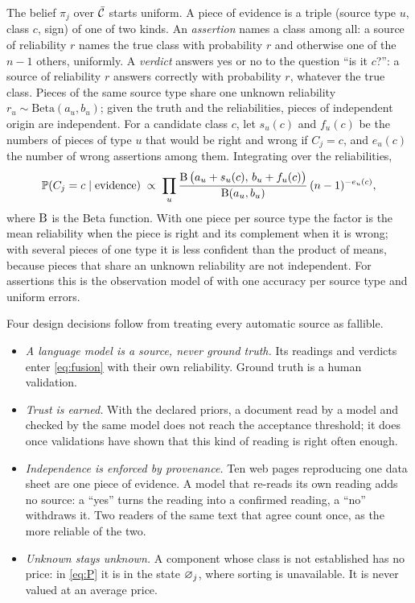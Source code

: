 The belief $\pi_j$ over $\bar{\mathcal{C}}$ starts uniform. A piece of evidence is a triple (source type $u$, class $c$, sign) of
one of two kinds. An \emph{assertion} names a class among all: a source of reliability $r$ names the true class with
probability $r$ and otherwise one of the $n-1$ others, uniformly. A \emph{verdict} answers yes or no to the question
``is it $c$?'': a source of reliability $r$ answers correctly with probability $r$, whatever the true class. Pieces
of the same source type share one unknown reliability $r_u\sim\mathrm{Beta}(a_u,b_u)$; given the truth and the
reliabilities, pieces of independent origin are independent. For a candidate class $c$, let $s_u(c)$ and $f_u(c)$
be the numbers of pieces of type $u$ that would be right and wrong if $C_j=c$, and $e_u(c)$ the number of wrong
assertions among them. Integrating over the reliabilities,
\begin{equation}\label{eq:fusion}
\mathbb{P}(C_j=c\mid\text{evidence})\;\propto\;\prod_{u}\frac{\operatorname{B}\big(a_u+s_u(c),\,b_u+f_u(c)\big)}{\operatorname{B}(a_u,b_u)}\,
(n-1)^{-e_u(c)},
\end{equation}
where $\operatorname{B}$ is the Beta function. With one piece per source type the factor is the mean reliability when the piece
is right and its complement when it is wrong; with several pieces of one type it is less confident than the product
of means, because pieces that share an unknown reliability are not independent. For assertions this is the
observation model of \citet{dawid1979} with one accuracy per source type and uniform errors.

Four design decisions follow from treating every automatic source as fallible.
\begin{itemize}
\item \emph{A language model is a source, never ground truth.} Its readings and verdicts enter \eqref{eq:fusion} with
  their own reliability. Ground truth is a human validation.
\item \emph{Trust is earned.} With the declared priors, a document read by a model and checked by the same model
  does not reach the acceptance threshold; it does once validations have shown that this kind of reading is right
  often enough.
\item \emph{Independence is enforced by provenance.} Ten web pages reproducing one data sheet are one piece of
  evidence. A model that re-reads its own reading adds no source: a ``yes'' turns the reading into a confirmed
  reading, a ``no'' withdraws it. Two readers of the same text that agree count once, as the more reliable of the
  two.
\item \emph{Unknown stays unknown.} A component whose class is not established has no price: in \eqref{eq:P} it is
  in the state $\varnothing_j$, where sorting is unavailable. It is never valued at an average price.
\end{itemize}

